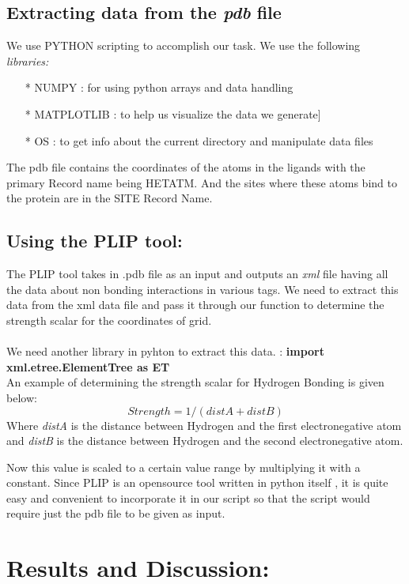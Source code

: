 \documentclass[12pt]{article}%
\begin{document}
\subsection{Extracting data from the \emph{pdb} file}

We use PYTHON scripting to accomplish our task. We use the following \emph{libraries:} \\

\begin{itemize}
\item[*] NUMPY : for using python arrays and data handling
\item[*] MATPLOTLIB : to help us visualize the data we generate]
\item[*] OS : to get info about the current directory and manipulate data files

\end{itemize}
The pdb file contains the coordinates of the atoms in the ligands with the primary Record name being HETATM.
And the sites where these atoms bind to the protein are in the SITE Record Name.

\subsection{Using the PLIP tool:}

The PLIP tool takes in .pdb file as an input and outputs an \emph{xml} file having all the data about non bonding interactions in various tags. We need to extract this data from the xml data file and pass it through our function to determine the strength scalar for the coordinates of grid. \\
\\
We need another library in pyhton to extract this data. : \textbf{import xml.etree.ElementTree as ET} \\
An example of determining the strength scalar for Hydrogen Bonding is given below:
\[ Strength = 1/(distA +distB) \]	
Where \emph{distA} is the distance between Hydrogen and the first electronegative atom and \emph{distB} is the distance between Hydrogen and the second electronegative atom.

Now this value is scaled to a certain value range by multiplying it with a constant.
Since PLIP is an opensource tool written in python itself , it is quite easy and convenient to incorporate it in our script so that the script would require just the pdb file to be given as input.

\newpage

\section{Results and Discussion:}
\end{document}
